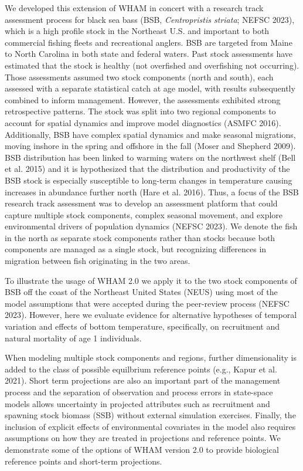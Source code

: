 \documentclass[
]{article}
\begin{document}
We developed this extension of WHAM in concert with a research track assessment process for black sea bass (BSB, \textit{Centropristis striata}; NEFSC 2023), which is a high profile stock in the Northeast U.S. and important to both commercial fishing fleets and recreational anglers. BSB are targeted from Maine to North Carolina in both state and federal waters. Past stock assessments have estimated that the stock is healthy (not overfished and overfishing not occurring). Those assessments assumed two stock components (north and south), each assessed with a separate statistical catch at age model, with results subsequently combined to inform management. However, the assessments exhibited strong retrospective patterns. The stock was split into two regional components to account for spatial dynamics and improve model diagnostics (ASMFC 2016). Additionally, BSB have complex spatial dynamics and make seasonal migrations, moving inshore in the spring and offshore in the fall (Moser and Shepherd 2009). BSB distribution has been linked to warming waters on the northwest shelf (Bell et al. 2015) and it is hypothesized that the distribution and productivity of the BSB stock is especially susceptible to long-term changes in temperature causing increases in abundance further north (Hare et al. 2016). Thus, a focus of the BSB research track assessment was to develop an assessment platform that could capture multiple stock components, complex seasonal movement, and explore environmental drivers of population dynamics (NEFSC 2023). We denote the fish in the north as separate stock components rather than stocks because both components are managed as a single stock, but recognizing differences in migration between fish originating in the two areas.

To illustrate the usage of WHAM 2.0 we apply it to the two stock components of BSB off the coast of the Northeast United States (NEUS) using most of the model assumptions that were accepted during the peer-review process (NEFSC 2023). However, here we evaluate evidence for alternative hypotheses of temporal variation and effects of bottom temperature, specifically, on recruitment and natural mortality of age 1 individuals.

When modeling multiple stock components and regions, further dimensionality is added to the class of possible equilbrium reference points (e.g., Kapur et al. 2021). Short term projections are also an important part of the management process and the separation of observation and process errors in state-space models allows uncertainty in projected attributes such as recruitment and spawning stock biomass (SSB) without external simulation exercises. Finally, the inclusion of explicit effects of environmental covariates in the model also requires assumptions on how they are treated in projections and reference points. We demonstrate some of the options of WHAM version 2.0 to provide biological reference points and short-term projections.
\end{document}
